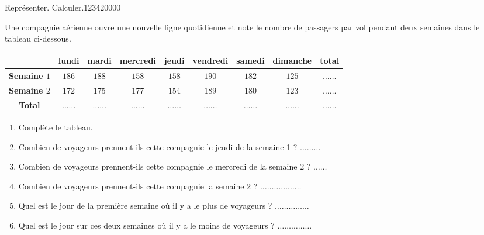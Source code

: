 

\begin{pageBrouillon} 
 

\end{pageBrouillon}


\begin{pageAuto} 


\begin{ExoAuto}{Représenter. Calculer.}{1234}{2}{0}{0}{0}{0}
 
Une compagnie aérienne ouvre une nouvelle ligne quotidienne et note le nombre de passagers par vol pendant deux semaines dans le tableau ci-dessous.

\begin{center}
\begin{tabular}{|c|c|c|c|c|c|c|c|c|}\hline 
 &  lundi	& mardi & mercredi& jeudi& vendredi& samedi& dimanche & total \\\hline
\textbf{Semaine $1$}  &  $186$	& $188$	 & $158$	& $158$	& $190$	& $182$	& $125$	 & $\ldots\ldots$	\\\hline
\textbf{Semaine $2$}  &  $172$  & $175$	 & $177$	& $154$	& $189$	& $180$	& $123$	 & $\ldots\ldots$\\\hline 
\textbf{Total}  &  $\ldots\ldots$  & $\ldots\ldots$	 & $\ldots\ldots$	& $\ldots\ldots$	& $\ldots\ldots$	& $\ldots\ldots$	& $\ldots\ldots$	 & $\ldots\ldots$\\\hline 
\end{tabular}
\end{center}

\begin{enumerate}
\item Complète le tableau.
\item Combien de voyageurs prennent-ils cette compagnie le jeudi de la semaine 1 ? $\ldots\ldots\ldots$
\item Combien de voyageurs prennent-ils cette compagnie le mercredi de la semaine 2 ? $\ldots\ldots$
\item Combien de voyageurs prennent-ils cette compagnie la semaine 2 ? $\ldots\ldots\ldots\ldots\ldots\ldots$
\item Quel est le jour de la première semaine où il y a le plus de voyageurs  ? $\ldots\ldots\ldots\ldots\ldots$
\item Quel est le jour sur ces deux semaines où il y a le moins de voyageurs  ? $\ldots\ldots\ldots\ldots\ldots$
\end{enumerate}


\end{ExoAuto}
\end{pageAuto}
